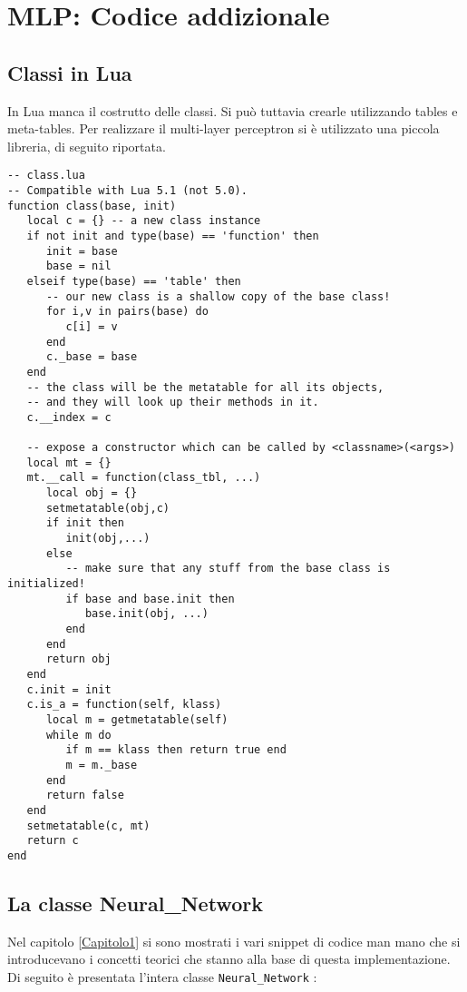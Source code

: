 
\chapter{MLP: Codice addizionale} %

\label{AppendixA} %

\section{Classi in Lua}
In Lua manca il costrutto delle classi. Si può tuttavia crearle utilizzando tables e meta-tables. Per realizzare il multi-layer perceptron si è utilizzato una piccola libreria, di seguito riportata. 

\begin{lstlisting}[language={[5.2]Lua}]
-- class.lua
-- Compatible with Lua 5.1 (not 5.0).
function class(base, init)
   local c = {} -- a new class instance
   if not init and type(base) == 'function' then
      init = base
      base = nil
   elseif type(base) == 'table' then
      -- our new class is a shallow copy of the base class!
      for i,v in pairs(base) do
         c[i] = v
      end
      c._base = base
   end
   -- the class will be the metatable for all its objects,
   -- and they will look up their methods in it.
   c.__index = c

   -- expose a constructor which can be called by <classname>(<args>)
   local mt = {}
   mt.__call = function(class_tbl, ...)
      local obj = {}
      setmetatable(obj,c)
      if init then
         init(obj,...)
      else
         -- make sure that any stuff from the base class is initialized!
         if base and base.init then
            base.init(obj, ...)
         end
      end
      return obj
   end
   c.init = init
   c.is_a = function(self, klass)
      local m = getmetatable(self)
      while m do
         if m == klass then return true end
         m = m._base
      end
      return false
   end
   setmetatable(c, mt)
   return c
end
\end{lstlisting}
\section{La classe Neural\_Network}
Nel capitolo \ref{Capitolo1} si sono mostrati i vari snippet di codice man mano che si introducevano i concetti teorici che stanno alla base di questa implementazione. Di seguito è presentata l'intera classe \texttt{Neural\_Network} :

